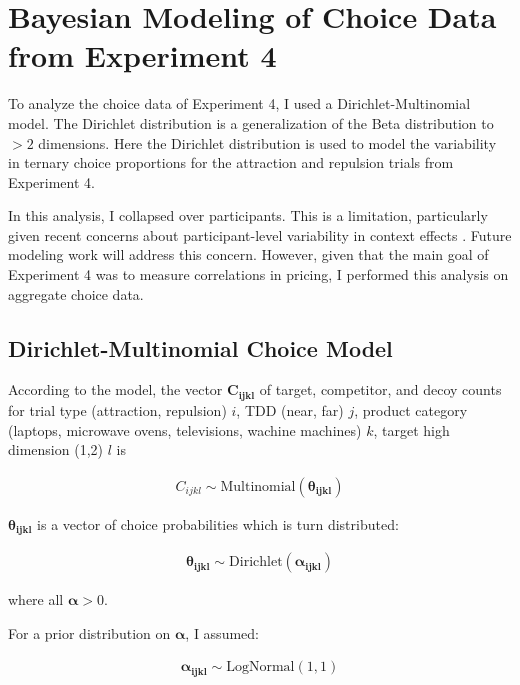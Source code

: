 \chapter{Bayesian Modeling of Choice Data from Experiment 4}

To analyze the choice data of Experiment 4, I used a Dirichlet-Multinomial model. The Dirichlet distribution is a generalization of the Beta distribution to $>2$ dimensions. Here the Dirichlet distribution is used to model the variability in ternary choice proportions for the attraction and repulsion trials from Experiment 4.

In this analysis, I collapsed over participants. This is a limitation, particularly given recent concerns about participant-level variability in context effects \parencite{liewAppropriacyAveragingStudy2016b,trueblood2015fragile}. Future modeling work will address this concern. However, given that the main goal of Experiment 4 was to measure correlations in pricing, I performed this analysis on aggregate choice data.

\section{Dirichlet-Multinomial Choice Model}

According to the model, the vector $\boldsymbol{C_{ijkl}}$ of target, competitor, and decoy counts for trial type (attraction, repulsion) $i$, TDD (near, far) $j$, product category (laptops, microwave ovens, televisions, wachine machines)  $k$, target high dimension (1,2) $l$ is 

\begin{align}
    C_{ijkl} \sim \text{Multinomial}(\boldsymbol{\theta_{ijkl}})
\end{align}

$\boldsymbol{\theta_{ijkl}}$ is a vector of choice probabilities which is turn distributed:

\begin{align}
    \boldsymbol{\theta_{ijkl}} \sim \text{Dirichlet}(\boldsymbol{\alpha_{ijkl}})
\end{align}

where all $\boldsymbol{\alpha}>0$. 

For a prior distribution on $\boldsymbol{\alpha}$, I assumed:

\begin{align}
    \boldsymbol{\alpha_{ijkl}} \sim \text{LogNormal}(1,1)
\end{align}

